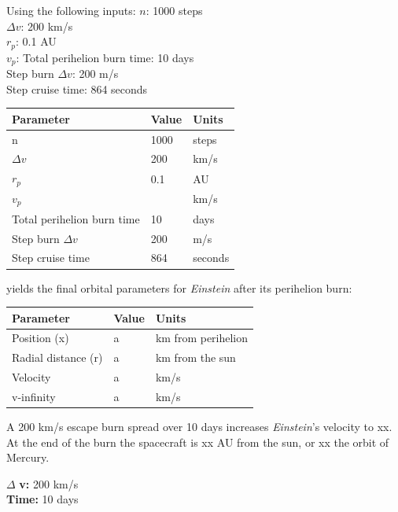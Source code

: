 \documentclass[12pt]{article} %
\begin{document}
Using the following inputs:
$n$: 1000 steps\\
$\Delta v$: 200 km/s\\
$r_p$: 0.1 AU\\
$v_p$: 
Total perihelion burn time: 10 days\\
Step burn $\Delta v$: 200 m/s\\
Step cruise time: 864 seconds\\


\begin{center}
\begin{tabular}{|m{5 cm}| m{5 cm}| m{5 cm}|} \hline
\textbf{Parameter} & \textbf{Value} & \textbf{Units}\\ \hline
n & 1000& steps\\ \hline
$\Delta v$ & 200& km/s \\ \hline
$r_p$      &  0.1& AU\\ \hline
$v_p$     &  & km/s\\ \hline
Total perihelion burn time & 10 & days \\ \hline
Step burn $\Delta v$ & 200 & m/s\\ \hline
Step cruise time & 864& seconds \\ \hline
\end{tabular}
\end{center}

yields the final orbital parameters for \textit{Einstein} after its perihelion burn:

\begin{center}
\begin{tabular}{|m{5 cm}| m{5 cm}| m{5 cm}|} \hline
\textbf{Parameter} & \textbf{Value} & \textbf{Units}\\ \hline
Position (x) & a& km from perihelion\\ \hline
Radial distance (r) & a& km from the sun\\ \hline
Velocity      &  a& km/s\\ \hline
v-infinity     &  a& km/s\\ \hline
\end{tabular}
\end{center}

A 200 km/s escape burn spread over 10 days increases \textit{Einstein}'s velocity to xx. At the end of the burn the spacecraft is xx AU from the sun, or xx the orbit of Mercury.


$\Delta$ \textbf{v:} 200 km/s\\
\textbf{Time:} 10 days\\
\end{document}
